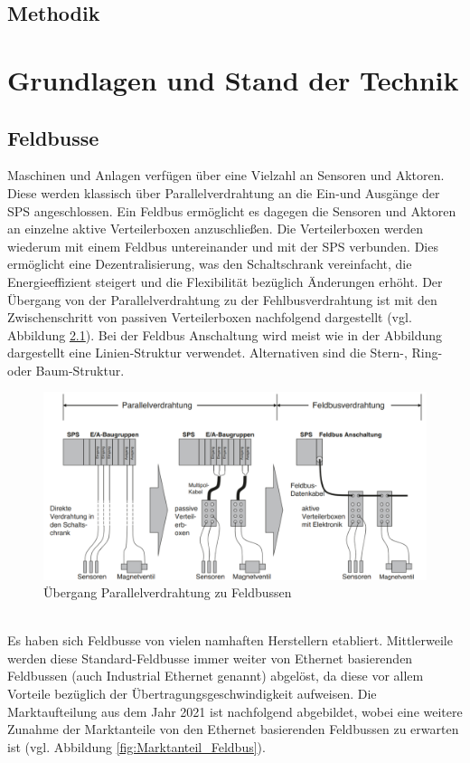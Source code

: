 \documentclass[ a4paper,
                oneside,
                toc=bibliography,
                toc=listof
                ]{scrbook}
\begin{document}
	\section{Methodik}

	\chapter{Grundlagen und Stand der Technik}
	
	\section{Feldbusse}
	Maschinen und Anlagen verfügen über eine Vielzahl an Sensoren und Aktoren. Diese werden klassisch über Parallelverdrahtung an die Ein-und Ausgänge der SPS angeschlossen. Ein Feldbus ermöglicht es dagegen die Sensoren und Aktoren an einzelne aktive Verteilerboxen anzuschließen. Die Verteilerboxen werden wiederum mit einem Feldbus untereinander und mit der SPS verbunden. Dies ermöglicht eine Dezentralisierung, was den Schaltschrank vereinfacht, die Energieeffizient steigert und die Flexibilität bezüglich Änderungen erhöht. Der Übergang von der Parallelverdrahtung zu der Fehlbusverdrahtung ist mit den Zwischenschritt von passiven Verteilerboxen nachfolgend dargestellt (vgl. Abbildung \ref{fig:Parallel_vs_Feldbus}). Bei der Feldbus Anschaltung wird meist wie in der Abbildung dargestellt eine Linien-Struktur verwendet. Alternativen sind die Stern-, Ring- oder Baum-Struktur. \cite{hering2012elektrotechnik}
	\begin{figure}[!ht]
		\centering
		\includegraphics[width=1.0\linewidth]{./images/Parallelverdrahtung_Feldbus.png}
		\caption{Übergang Parallelverdrahtung zu Feldbussen \cite{hering2012elektrotechnik}}
		\label{fig:Parallel_vs_Feldbus}
	\end{figure}\\
	Es haben sich Feldbusse von vielen namhaften Herstellern etabliert. Mittlerweile werden diese Standard-Feldbusse immer weiter von Ethernet basierenden Feldbussen (auch Industrial Ethernet genannt) abgelöst, da diese vor allem Vorteile bezüglich der Übertragungsgeschwindigkeit aufweisen. Die Marktaufteilung aus dem Jahr 2021 ist nachfolgend abgebildet, wobei eine weitere Zunahme der Marktanteile von den Ethernet basierenden Feldbussen zu erwarten ist (vgl. Abbildung \ref{fig:Marktanteil_Feldbus}). \cite{hering2012elektrotechnik} \cite{Marktanteile_HMS}\\
\end{document}
